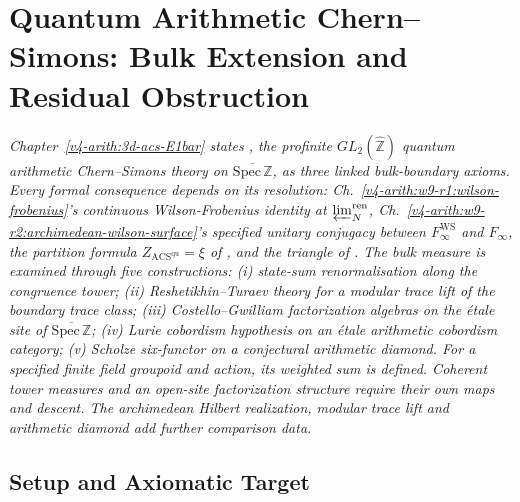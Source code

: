 \chapter{Quantum Arithmetic Chern--Simons: Bulk Extension and Residual Obstruction}
\label{v4-arith:w10-a:chapter}

\emph{Chapter~\ref{v4-arith:3d-acs-E1bar} states
, the profinite
\(GL_{2}(\widehat{\mathbb Z})\) quantum arithmetic Chern--Simons
theory on \(\overline{\mathrm{Spec}\,\mathbb{Z}}\), as three linked
bulk-boundary axioms. Every formal consequence depends on its
resolution: Ch.~\ref{v4-arith:w9-r1:wilson-frobenius}'s continuous
Wilson-Frobenius identity at \(\varprojlim_{N}^{\mathrm{ren}}\),
Ch.~\ref{v4-arith:w9-r2:archimedean-wilson-surface}'s specified
unitary conjugacy between \(F_{\infty}^{\mathrm{WS}}\) and
\(F_{\infty}\), the partition formula
\(Z_{\mathrm{ACS}^{\mathrm{qu}}}=\xi\) of
, and the triangle of
. The bulk measure is examined through
five constructions: (i) state-sum renormalisation along the congruence
tower; (ii) Reshetikhin--Turaev theory for a modular trace lift of the
boundary trace class; (iii) Costello--Gwilliam factorization algebras on the
\'etale site of \(\overline{\mathrm{Spec}\,\mathbb{Z}}\); (iv) Lurie
cobordism hypothesis on an \'etale arithmetic cobordism category;
(v) Scholze six-functor on a conjectural arithmetic diamond. For a specified finite field groupoid and action, its weighted sum
is defined. Coherent tower measures and an open-site factorization
structure require their own maps and descent. The archimedean Hilbert
realization, modular trace lift and arithmetic diamond add further
comparison data.}

\section{Setup and Axiomatic Target}
\label{v4-arith:w10-a:setup}


